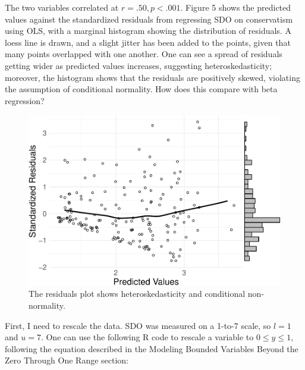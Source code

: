 \documentclass[english,man]{apa6}
\newenvironment{Shaded}{\begin{snugshade}}{\end{snugshade}}
\newcommand{\DecValTok}[1]{\textcolor[rgb]{0.00,0.00,0.81}{#1}}
\newcommand{\StringTok}[1]{\textcolor[rgb]{0.31,0.60,0.02}{#1}}
\newcommand{\OperatorTok}[1]{\textcolor[rgb]{0.81,0.36,0.00}{\textbf{#1}}}
\newcommand{\NormalTok}[1]{#1}
\theoremstyle{definition}
\theoremstyle{definition}
\theoremstyle{remark}
\begin{document}
The two variables correlated at \(r = .50, p < .001\). Figure 5 shows
the predicted values against the standardized residuals from regressing
SDO on conservatism using OLS, with a marginal histogram showing the
distribution of residuals. A loess line is drawn, and a slight jitter
has been added to the points, given that many points overlapped with one
another. One can see a spread of residuals getting wider as predicted
values increases, suggesting heteroskedasticity; moreover, the histogram
shows that the residuals are positively skewed, violating the assumption
of conditional normality. How does this compare with beta regression?

\begin{figure}
\centering
\includegraphics{beta_hurdle_files/figure-latex/unnamed-chunk-12-1.pdf}
\caption{\label{fig:unnamed-chunk-12}The residuals plot shows
heteroskedasticity and conditional non-normality.}
\end{figure}

First, I need to rescale the data. SDO was measured on a 1-to-7 scale,
so \(l = 1\) and \(u = 7\). One can use the following R code to rescale
a variable to \(0 \leq y \leq 1\), following the equation described in
the Modeling Bounded Variables Beyond the Zero Through One Range
section:

\begin{Shaded}
\end{Shaded}
\end{document}

